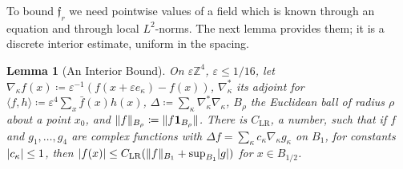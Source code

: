 \documentclass[11pt]{preprint}
\DeclarePairedDelimiter{\abs}{\lvert}{\rvert}
\DeclarePairedDelimiter{\norm}{\lVert}{\rVert}
\numberwithin{equation}{section}
\newtheorem{lemma}[theorem]{Lemma}
\theoremstyle{definition}
\theoremstyle{remark}
\theoremstyle{plain}
\begin{document}
To bound $\mathfrak f_r$ we need pointwise values of a field which is known through an equation and through local $L^2$-norms. The next lemma provides them; it is a discrete interior estimate, uniform in the spacing.

\begin{lemma}[An Interior Bound]\label{lem:interior-bound}
On $\varepsilon\mathbb Z^4$, $\varepsilon \leq 1/16$, let $\nabla_\kappa f(x) \coloneqq \varepsilon^{-1}(f(x + \varepsilon e_\kappa) - f(x))$, $\nabla_\kappa^*$ its adjoint for $\langle f, h\rangle \coloneqq \varepsilon^4\sum_x\bar f(x)h(x)$, $\Delta \coloneqq \sum_\kappa\nabla_\kappa^*\nabla_\kappa$, $B_\rho$ the Euclidean ball of radius $\rho$ about a point $x_0$, and $\norm f_{B_\rho} \coloneqq \norm{f\mathbf 1_{B_\rho}}$. There is $C_{\mathrm{LR}}$, a number, such that if $f$ and $g_1, \dots, g_4$ are complex functions with $\Delta f = \sum_\kappa c_\kappa\nabla_\kappa g_\kappa$ on $B_1$, for constants $\abs{c_\kappa} \leq 1$, then $\abs{f(x)} \leq C_{\mathrm{LR}}(\norm f_{B_1} + \sup_{B_1}\abs g)$ for $x \in B_{1/2}$.
\end{lemma}
\end{document}
